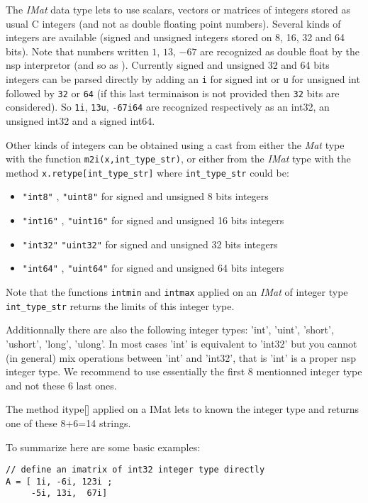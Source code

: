 \begin{mandescription}

The \emph{IMat} data type lets to use scalars, vectors or matrices of
integers stored as usual C integers (and not as double floating point numbers). 
Several kinds of integers are available (signed and unsigned integers stored
on 8, 16, 32 and 64 bits). Note that numbers written $1$, $13$, $-67$
are recognized as double float by the nsp interpretor (and so as ).
Currently signed and unsigned 32 and 64 bits integers can be parsed
directly by adding an \verb+i+ for signed int or  \verb+u+ for unsigned int 
followed by \verb+32+ or \verb+64+ (if this last terminaison is not provided
then \verb+32+ bits are considered). So  \verb+1i+,  \verb+13u+, \verb+-67i64+
are recognized respectively as an int32, an unsigned int32 and a signed int64. 

Other kinds of integers can be obtained using a cast from either the \emph{Mat} type
with the function \verb=m2i(x,int_type_str)=, or either from the \emph{IMat} type with
the method \verb+x.retype[int_type_str]+ where \verb+int_type_str+ could be:
\begin{itemize}
\item \verb+"int8"+ , \verb+"uint8"+ for signed and unsigned 8 bits integers
\item \verb+"int16"+ , \verb+"uint16"+ for signed and unsigned 16 bits integers
\item \verb+"int32"+  \verb+"uint32"+ for signed and unsigned 32 bits integers
\item \verb+"int64"+ , \verb+"uint64"+ for signed and unsigned 64 bits integers
\end{itemize}
Note that the functions \verb+intmin+ and  \verb+intmax+  applied on an \emph{IMat} of
integer type \verb+int_type_str+ returns the limits of this integer type.

Additionnally there are also the following integer types: 'int', 'uint', 
'short', 'ushort', 'long', 'ulong'. In most cases 'int' is equivalent
to 'int32' but you cannot (in general) mix operations between  'int' and
'int32', that is 'int' is a proper nsp integer type. We recommend to use
essentially the first 8 mentionned integer type and not these 6 last ones.  

The method itype[] applied on a IMat lets to known the integer type and returns 
one of these 8+6=14 strings.

To summarize here are some basic examples:
\begin{Verbatim}
// define an imatrix of int32 integer type directly
A = [ 1i, -6i, 123i ;
     -5i, 13i,  67i]


\end{Verbatim}
\end{mandescription}
